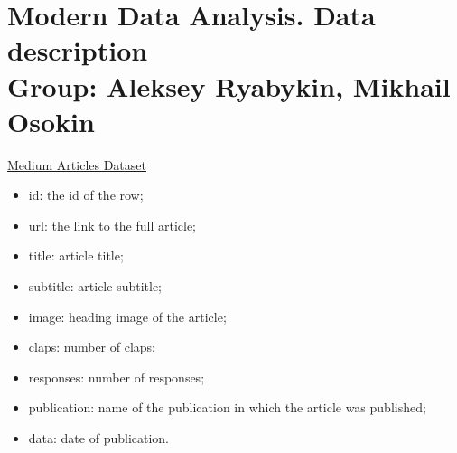 \documentclass[12pt]{report}
\begin{document}
\boldmath
\pagestyle{fancy}

\chapter{Modern Data Analysis. Data description\\[0.1cm] \hspace*{0.25cm} \large Group: Aleksey Ryabykin, Mikhail Osokin\\}

\begin{center}
    \large \href{https://www.kaggle.com/datasets/dorianlazar/medium-articles-dataset}{Medium Articles Dataset}
\end{center}
\begin{itemize}
    \item id: the id of the row;
    \item url: the link to the full article;
    \item title: article title;
    \item subtitle: article subtitle;
    \item image: heading image of the article;
    \item claps: number of claps;
    \item responses: number of responses;
    \item publication: name of the publication in which the article was published;
    \item data: date of publication.
\end{itemize}
\end{document}
